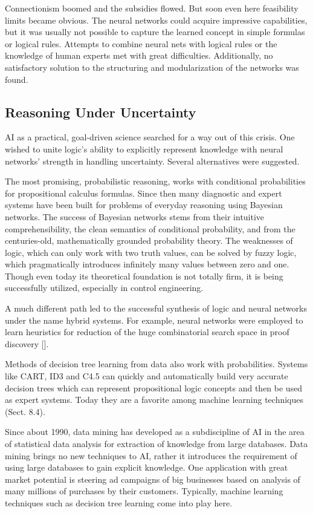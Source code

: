 \documentclass[10pt]{book}
\begin{document}
Connectionism boomed and the subsidies flowed. But soon even here feasibility limits became obvious. The neural networks could acquire impressive capabilities, but it was usually not possible to capture the learned concept in simple formulas or logical rules. Attempts to combine neural nets with logical rules or the knowledge of human experts met with great difficulties. Additionally, no satisfactory solution to the structuring and modularization of the networks was found.

\subsection{Reasoning Under Uncertainty}
AI as a practical, goal-driven science searched for a way out of this crisis. One wished to unite logic's ability to explicitly represent knowledge with neural networks' strength in handling uncertainty. Several alternatives were suggested.

The most promising, probabilistic reasoning, works with conditional probabilities for propositional calculus formulas. Since then many diagnostic and expert systems have been built for problems of everyday reasoning using Bayesian\\
networks. The success of Bayesian networks stems from their intuitive comprehensibility, the clean semantics of conditional probability, and from the centuries-old, mathematically grounded probability theory.
The weaknesses of logic, which can only work with two truth values, can be solved by fuzzy logic, which pragmatically introduces infinitely many values between zero and one. Though even today its theoretical foundation is not totally firm, it is being successfully utilized, especially in control engineering.

A much different path led to the successful synthesis of logic and neural networks under the name hybrid systems. For example, neural networks were employed to learn heuristics for reduction of the huge combinatorial search space in proof discovery [\cite{suttner1990heuristics}].

Methods of decision tree learning from data also work with probabilities. Systems like CART, ID3 and C4.5 can quickly and automatically build very accurate decision trees which can represent propositional logic concepts and then be used as expert systems. Today they are a favorite among machine learning techniques (Sect. 8.4).

Since about 1990, data mining has developed as a subdiscipline of AI in the area of statistical data analysis for extraction of knowledge from large databases. Data mining brings no new techniques to AI, rather it introduces the requirement of using large databases to gain explicit knowledge. One application with great market potential is steering ad campaigns of big businesses based on analysis of many millions of purchases by their customers. Typically, machine learning techniques such as decision tree learning come into play here.
\end{document}
